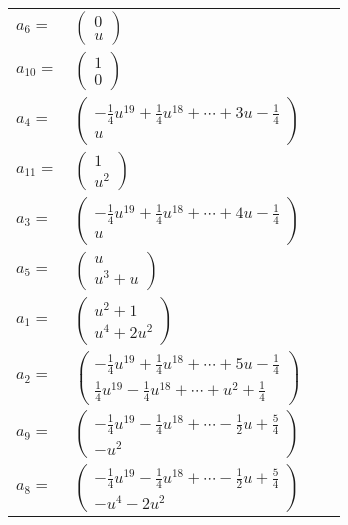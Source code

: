 \documentclass[1p]{elsarticle_modified}
\theoremstyle{definition}
\begin{document}
\begin{tabular}{m{7pt} m{180pt} m{7pt} m{180pt} }
\flushright $a_{6}=$&$\begin{pmatrix}0\\u\end{pmatrix}$ \\
\flushright $a_{10}=$&$\begin{pmatrix}1\\0\end{pmatrix}$ \\
\flushright $a_{4}=$&$\begin{pmatrix}-\frac{1}{4} u^{19}+\frac{1}{4} u^{18}+\cdots+3 u-\frac{1}{4}\\u\end{pmatrix}$ \\
\flushright $a_{11}=$&$\begin{pmatrix}1\\u^2\end{pmatrix}$ \\
\flushright $a_{3}=$&$\begin{pmatrix}-\frac{1}{4} u^{19}+\frac{1}{4} u^{18}+\cdots+4 u-\frac{1}{4}\\u\end{pmatrix}$ \\
\flushright $a_{5}=$&$\begin{pmatrix}u\\u^3+u\end{pmatrix}$ \\
\flushright $a_{1}=$&$\begin{pmatrix}u^2+1\\u^4+2 u^2\end{pmatrix}$ \\
\flushright $a_{2}=$&$\begin{pmatrix}-\frac{1}{4} u^{19}+\frac{1}{4} u^{18}+\cdots+5 u-\frac{1}{4}\\\frac{1}{4} u^{19}-\frac{1}{4} u^{18}+\cdots+u^2+\frac{1}{4}\end{pmatrix}$ \\
\flushright $a_{9}=$&$\begin{pmatrix}-\frac{1}{4} u^{19}-\frac{1}{4} u^{18}+\cdots-\frac{1}{2} u+\frac{5}{4}\\- u^2\end{pmatrix}$ \\
\flushright $a_{8}=$&$\begin{pmatrix}-\frac{1}{4} u^{19}-\frac{1}{4} u^{18}+\cdots-\frac{1}{2} u+\frac{5}{4}\\- u^4-2 u^2\end{pmatrix}$ \\

\end{tabular}
\end{document}
